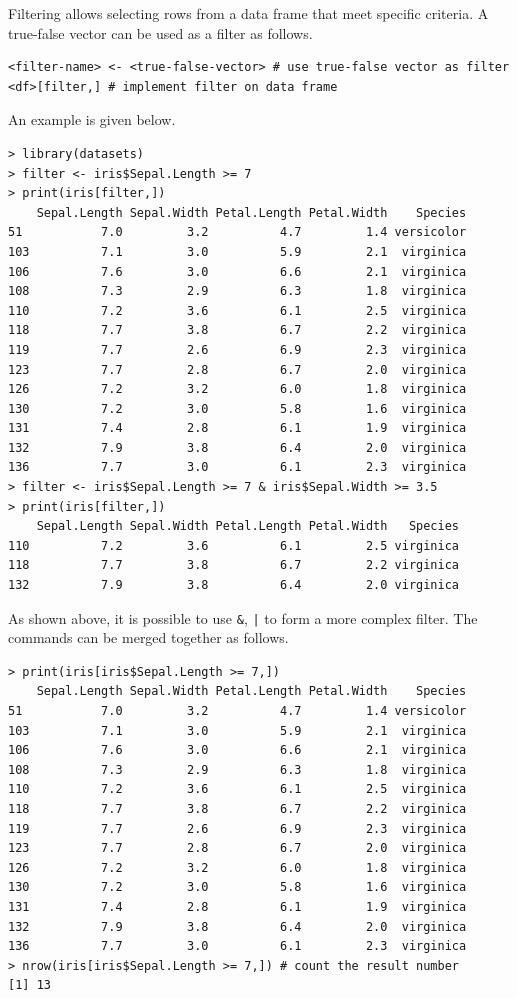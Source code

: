 Filtering allows selecting rows from a data frame that meet specific criteria. A true-false vector can be used as a filter as follows.
\begin{lstlisting}
<filter-name> <- <true-false-vector> # use true-false vector as filter
<df>[filter,] # implement filter on data frame
\end{lstlisting}
An example is given below.
\begin{lstlisting}
> library(datasets)
> filter <- iris$Sepal.Length >= 7
> print(iris[filter,])
    Sepal.Length Sepal.Width Petal.Length Petal.Width    Species
51           7.0         3.2          4.7         1.4 versicolor
103          7.1         3.0          5.9         2.1  virginica
106          7.6         3.0          6.6         2.1  virginica
108          7.3         2.9          6.3         1.8  virginica
110          7.2         3.6          6.1         2.5  virginica
118          7.7         3.8          6.7         2.2  virginica
119          7.7         2.6          6.9         2.3  virginica
123          7.7         2.8          6.7         2.0  virginica
126          7.2         3.2          6.0         1.8  virginica
130          7.2         3.0          5.8         1.6  virginica
131          7.4         2.8          6.1         1.9  virginica
132          7.9         3.8          6.4         2.0  virginica
136          7.7         3.0          6.1         2.3  virginica
> filter <- iris$Sepal.Length >= 7 & iris$Sepal.Width >= 3.5
> print(iris[filter,])
    Sepal.Length Sepal.Width Petal.Length Petal.Width   Species
110          7.2         3.6          6.1         2.5 virginica
118          7.7         3.8          6.7         2.2 virginica
132          7.9         3.8          6.4         2.0 virginica
\end{lstlisting}
As shown above, it is possible to use \verb|&|, \verb$|$ to form a more complex filter. The commands can be merged together as follows.
\begin{lstlisting}
> print(iris[iris$Sepal.Length >= 7,])
    Sepal.Length Sepal.Width Petal.Length Petal.Width    Species
51           7.0         3.2          4.7         1.4 versicolor
103          7.1         3.0          5.9         2.1  virginica
106          7.6         3.0          6.6         2.1  virginica
108          7.3         2.9          6.3         1.8  virginica
110          7.2         3.6          6.1         2.5  virginica
118          7.7         3.8          6.7         2.2  virginica
119          7.7         2.6          6.9         2.3  virginica
123          7.7         2.8          6.7         2.0  virginica
126          7.2         3.2          6.0         1.8  virginica
130          7.2         3.0          5.8         1.6  virginica
131          7.4         2.8          6.1         1.9  virginica
132          7.9         3.8          6.4         2.0  virginica
136          7.7         3.0          6.1         2.3  virginica
> nrow(iris[iris$Sepal.Length >= 7,]) # count the result number
[1] 13
\end{lstlisting}

